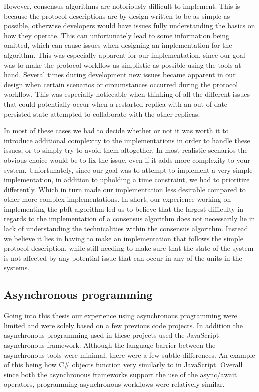 However, consensus algorithms are notoriously difficult to implement. This is because the protocol descriptions are by design written to be as simple as possible, otherwise developers would have issues fully understanding the basics on how they operate. This can unfortunately lead to some information being omitted, which can cause issues when designing an implementation for the algorithm. This was especially apparent for our implementation, since our goal was to make the protocol workflow as simplistic as possible using the tools at hand. Several times during development new issues became apparent in our design when certain scenarios or circumstances occurred during the protocol workflow. This was especially noticeable when thinking of all the different issues that could potentially occur when a restarted replica with an out of date persisted state attempted to collaborate with the other replicas.

In most of these cases we had to decide whether or not it was worth it to introduce additional complexity to the implementations in order to handle these issues, or to simply try to avoid them altogether. In most realistic scenarios the obvious choice would be to fix the issue, even if it adds more complexity to your system. Unfortunately, since our goal was to attempt to implement a very simple implementation, in addition to upholding a time constraint, we had to prioritize differently. Which in turn made our implementation less desirable compared to other more complex implementations. In short, our experience working on implementing the \ac{pbft} algorithm led us to believe that the largest difficulty in regards to the implementation of a consensus algorithm does not necessarily lie in lack of understanding the technicalities within the consensus algorithm. Instead we believe it lies in having to make an implementation that follows the simple protocol description, while still needing to make sure that the state of the system is not affected by any potential issue that can occur in any of the units in the systems. 

\subsection{Asynchronous programming}
Going into this thesis our experience using asynchronous programming were limited and were solely based on a few previous code projects. In addition the asynchronous programming used in these projects used the JavaScript asynchronous framework. Although the language barrier between the asynchronous tools were minimal, there were a few subtle differences. An example of this being how C\#  objects function very similarly to  in JavaScript. Overall since both the asynchronous frameworks support the use of the async/await operators, programming asynchronous workflows were relatively similar.

